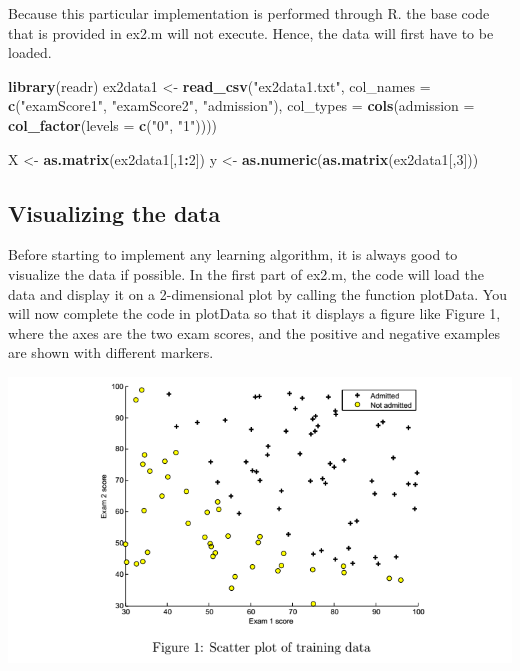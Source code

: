 \documentclass[
]{book}
\newenvironment{Shaded}{\begin{snugshade}}{\end{snugshade}}
\newcommand{\DataTypeTok}[1]{\textcolor[rgb]{0.13,0.29,0.53}{#1}}
\newcommand{\DecValTok}[1]{\textcolor[rgb]{0.00,0.00,0.81}{#1}}
\newcommand{\KeywordTok}[1]{\textcolor[rgb]{0.13,0.29,0.53}{\textbf{#1}}}
\newcommand{\NormalTok}[1]{#1}
\newcommand{\OperatorTok}[1]{\textcolor[rgb]{0.81,0.36,0.00}{\textbf{#1}}}
\newcommand{\StringTok}[1]{\textcolor[rgb]{0.31,0.60,0.02}{#1}}
\begin{document}
Because this particular implementation is performed through R. the base code that is provided in ex2.m will not execute. Hence, the data will first have to be loaded.

\begin{Shaded}
\begin{Highlighting}[]
\KeywordTok{library}\NormalTok{(readr)}
\NormalTok{ex2data1 <-}\StringTok{ }\KeywordTok{read_csv}\NormalTok{(}\StringTok{"ex2data1.txt"}\NormalTok{, }
                     \DataTypeTok{col_names =}  \KeywordTok{c}\NormalTok{(}\StringTok{"examScore1"}\NormalTok{, }\StringTok{"examScore2"}\NormalTok{, }\StringTok{"admission"}\NormalTok{),}
                     \DataTypeTok{col_types =} \KeywordTok{cols}\NormalTok{(}\DataTypeTok{admission =} \KeywordTok{col_factor}\NormalTok{(}\DataTypeTok{levels =} \KeywordTok{c}\NormalTok{(}\StringTok{"0"}\NormalTok{, }\StringTok{"1"}\NormalTok{))))}

\NormalTok{X  <-}\StringTok{ }\KeywordTok{as.matrix}\NormalTok{(ex2data1[,}\DecValTok{1}\OperatorTok{:}\DecValTok{2}\NormalTok{])}
\NormalTok{y <-}\StringTok{ }\KeywordTok{as.numeric}\NormalTok{(}\KeywordTok{as.matrix}\NormalTok{(ex2data1[,}\DecValTok{3}\NormalTok{]))}
\end{Highlighting}
\end{Shaded}

\hypertarget{visualizing-the-data}{%
\subsection{Visualizing the data}\label{visualizing-the-data}}

Before starting to implement any learning algorithm, it is always good to visualize the data if possible. In the first part of ex2.m, the code will load the data and display it on a 2-dimensional plot by calling the function plotData. You will now complete the code in plotData so that it displays a figure like Figure 1, where the axes are the two exam scores, and the positive and negative examples are shown with different markers.

\includegraphics{ex2plot1.png}
\end{document}
